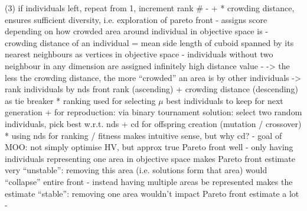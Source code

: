 \documentclass[twoside,11pt]{article}
\begin{document}
        (3) if individuals left, repeat from 1, increment rank \#
        - \citep[p. 201]{genetic_algos} + \citep[pp. 183f]{NSGA_II}
      * crowding distance, ensures sufficient diversity, i.e. exploration of pareto front
        - assigns score depending on how crowded area around individual in objective space is
        - crowding distance of an individual = mean side length of cuboid spanned by its nearest neighbours as vertices in objective space
        - individuals without two neighbour in any dimension are assigned infinitely high distance value
        - \citep[p. 185]{NSGA_II}
        -> the less the crowding distance, the more ``crowded'' an area is by other individuals
      -> rank individuals by nds front rank (ascending) + crowding distance (descending) as tie breaker
  * ranking used for selecting $\mu$ best individuals to keep for next generation + for reproduction: via binary tournament solution: select two random individuals,
    pick best w.r.t. nds + cd for offspring creation (mutation / crossover)
  * using nds for ranking / fitness makes intuitive sense, but why cd?
    - goal of MOO: not simply optimise HV, but approx true Pareto front well
    - only having individuals representing one area in objective space makes Pareto front estimate very ``unstable'': removing this area (i.e. solutions form that area)
      would ``collapse'' entire front
    - instead having multiple areas be represented makes the estimate ``stable'': removing one area wouldn't impact Pareto front estimate a lot
    - \citep[p. 185, pp. 189-192]{genetic_algos}


\end{document}
